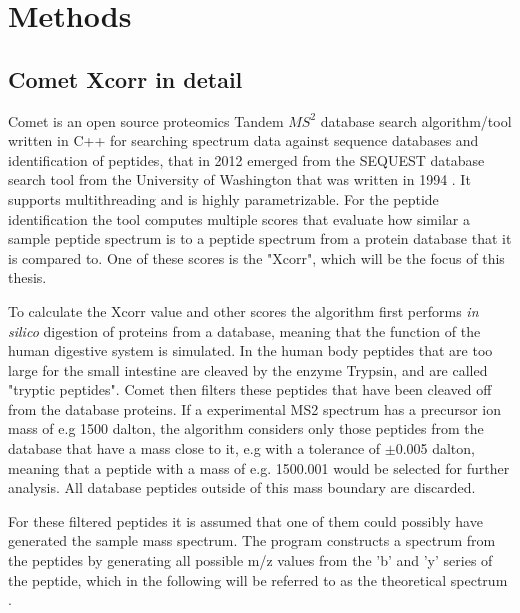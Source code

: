 \documentclass[11pt]{article}
\begin{document}
\newpage

\section{Methods}
\subsection{Comet Xcorr in detail}
Comet is an open source proteomics Tandem \(MS^2\) database search algorithm/tool written in C++ for searching spectrum data against sequence databases and identification of peptides, that in 2012 emerged from the SEQUEST database search tool from the University of Washington that was written in 1994 \cite{comet-search-tool}. It supports multithreading and is highly parametrizable. For the peptide identification the tool computes multiple scores that evaluate how similar a sample peptide spectrum is to a peptide spectrum from a protein database that it is compared to. One of these scores is the "Xcorr", which will be the focus of this thesis. 


To calculate the Xcorr value and other scores the algorithm first performs \textit{in silico} digestion of proteins from a database, meaning that the function of the human digestive system is simulated. In the human body peptides that are too large for the small intestine are cleaved by the enzyme Trypsin, and are called "tryptic peptides". Comet then filters these peptides that have been cleaved off from the database proteins. If a experimental MS2 spectrum has a precursor ion mass of e.g 1500 dalton, the algorithm considers only those peptides from the database that have a mass close to it, e.g with a tolerance of  $\pm$0.005 dalton, meaning that a peptide with a mass of e.g. 1500.001 would be selected for further analysis. All database peptides outside of this mass boundary are discarded.

For these filtered peptides it is assumed that one of them could possibly have generated the sample mass spectrum. The program constructs a spectrum from the peptides by generating all possible m/z values from the 'b' and 'y' series of the peptide, which in the following will be referred to as the theoretical spectrum \cite{comet-first-paper}. 
\end{document}
